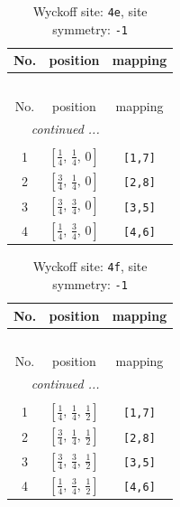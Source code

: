 \documentclass[fleqn,8pt]{jsarticle}
\begin{document}
\begin{longtable}{ccc}
\caption{Wyckoff site: {\tt 4e}, site symmetry: {\tt -1}}
 \\
 \hline \hline
No. & position & mapping \\ \hline \endfirsthead

\multicolumn{2}{l}{\tablename\ \thetable{}} \\
 \hline \hline
No. & position & mapping \\ \hline \endhead

 \hline \hline
\multicolumn{2}{r}{\footnotesize\it continued ...} \\ \endfoot

 \hline \hline
\multicolumn{2}{r}{} \\ \endlastfoot

1 & $\left[ \frac{1}{4},\, \frac{1}{4},\, 0 \right]$ & {\tt [1,7]} \\ \hline
2 & $\left[ \frac{3}{4},\, \frac{1}{4},\, 0 \right]$ & {\tt [2,8]} \\ \hline
3 & $\left[ \frac{3}{4},\, \frac{3}{4},\, 0 \right]$ & {\tt [3,5]} \\ \hline
4 & $\left[ \frac{1}{4},\, \frac{3}{4},\, 0 \right]$ & {\tt [4,6]} \\
\end{longtable}
\renewcommand{\arraystretch}{1.2}
\begin{longtable}{ccc}
\caption{Wyckoff site: {\tt 4f}, site symmetry: {\tt -1}}
 \\
 \hline \hline
No. & position & mapping \\ \hline \endfirsthead

\multicolumn{2}{l}{\tablename\ \thetable{}} \\
 \hline \hline
No. & position & mapping \\ \hline \endhead

 \hline \hline
\multicolumn{2}{r}{\footnotesize\it continued ...} \\ \endfoot

 \hline \hline
\multicolumn{2}{r}{} \\ \endlastfoot

1 & $\left[ \frac{1}{4},\, \frac{1}{4},\, \frac{1}{2} \right]$ & {\tt [1,7]} \\ \hline
2 & $\left[ \frac{3}{4},\, \frac{1}{4},\, \frac{1}{2} \right]$ & {\tt [2,8]} \\ \hline
3 & $\left[ \frac{3}{4},\, \frac{3}{4},\, \frac{1}{2} \right]$ & {\tt [3,5]} \\ \hline
4 & $\left[ \frac{1}{4},\, \frac{3}{4},\, \frac{1}{2} \right]$ & {\tt [4,6]} \\
\end{longtable}
\end{document}
